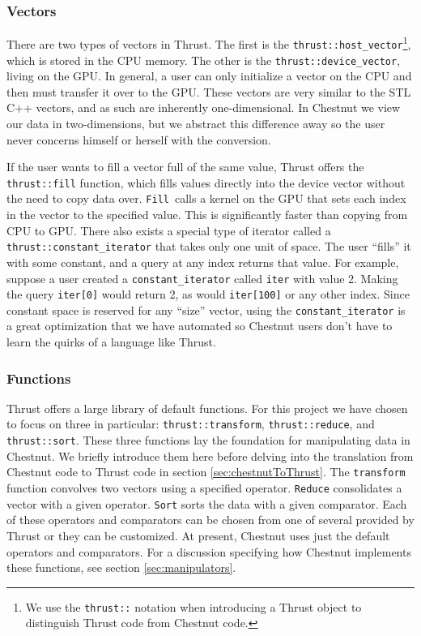 \documentclass[twocolumn]{article}
\renewcommand{\|}{\origbar} %
\newcommand{\code}[1]{\texttt{#1}}
\begin{document}
\subsubsection{Vectors}

There are two types of vectors in Thrust. The first is the \code{thrust::host\_vector}\footnote{We use the \code{thrust::} notation when introducing a Thrust object to distinguish Thrust code from Chestnut code.}, which is stored in the CPU memory. The other is the \code{thrust::device\_vector}, living on the GPU. In general, a user can only initialize a vector on the CPU and then must transfer it over to the GPU. These vectors are very similar to the STL C++ vectors, and as such are inherently one-dimensional. In Chestnut we view our data in two-dimensions, but we abstract this difference away so the user never concerns himself or herself with the conversion. 

If the user wants to fill a vector full of the same value, Thrust offers the \code{thrust::fill} function, which fills values directly into the device vector without the need to copy data over. \code{Fill}~calls a kernel on the GPU that sets each index in the vector to the specified value. This is significantly faster than copying from CPU to GPU. There also exists a special type of iterator called a \code{thrust::constant\_iterator} that takes only one unit of space. The user ``fills'' it with some constant, and a query at any index returns that value. For example, suppose a user created a \code{constant\_iterator} called \code{iter} with value 2. Making the query \code{iter[0]} would return 2, as would \code{iter[100]} or any other index. Since constant space is reserved for any ``size'' vector, using  the \code{constant\_iterator} is a great optimization that we have automated so Chestnut users don't have to learn the quirks of a language like Thrust. 

\subsubsection{Functions}

Thrust offers a large library of default functions. For this project we have chosen to focus on three in particular: \code{thrust::transform}, \code{thrust::reduce}, and \code{thrust::sort}. These three functions lay the foundation for manipulating data in Chestnut. We briefly introduce them here before delving into the translation from Chestnut code to Thrust code in section \ref{sec:chestnutToThrust}. The \code{transform} function convolves two vectors using a specified operator. \code{Reduce} consolidates a vector with a given operator. \code{Sort} sorts the data with a given comparator. Each of these operators and comparators can be chosen from one of several provided by Thrust or they can be customized. At present, Chestnut uses just the default operators and comparators. For a discussion specifying how Chestnut implements these functions, see section \ref{sec:manipulators}.
\end{document}
